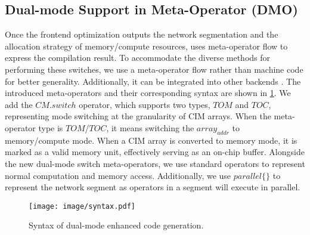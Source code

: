 \subsection{Dual-mode Support in Meta-Operator (DMO)}
Once the frontend optimization outputs the network segmentation and the allocation strategy of memory/compute resources, 
\name uses meta-operator flow to express the compilation result.
To accommodate the diverse methods for performing these switches, we use a meta-operator flow rather than machine code for better generality. Additionally, it can be integrated into other backends \cite{qu2024cim}. 
The introduced meta-operators and their corresponding syntax are shown in \fig \ref{fig:syntax}. 
We add the $CM.switch$ operator, which supports two types, $TOM$ and $TOC$, representing mode switching at the granularity of CIM arrays. 
When the meta-operator type is $TOM$/$TOC$, it means switching the $array_{addr}$ to memory/compute mode.
When a CIM array is converted to memory mode, it is marked as a valid memory unit, effectively serving as an on-chip buffer. Alongside the new dual-mode switch meta-operators, we use standard operators to represent normal computation and memory access. 
Additionally, we use $parallel \{\}$ to represent the network segment as operators in a segment will execute in parallel.
\begin{figure}[t]
    \centering
    \texttt{[image: image/syntax.pdf]}
    \caption{Syntax of dual-mode enhanced code generation.}
    \label{fig:syntax}
\end{figure}